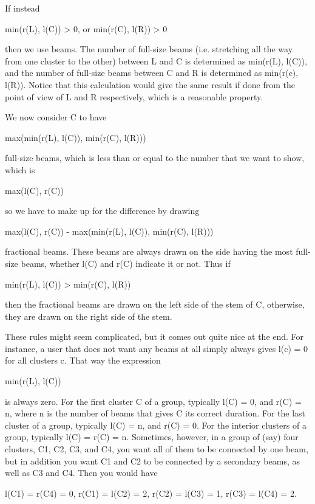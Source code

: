 If instead 

        min(r(L), l(C)) > 0, or
        min(r(C), l(R)) > 0

then we use beams.  The number of full-size beams (i.e. stretching all
the way from one cluster to the other) between L and C is determined as
min(r(L), l(C)), and the number of full-size beams between C and R is
determined as min(r(c), l(R)).  Notice that this calculation would give
the same result if done from the point of view of L and R respectively,
which is a reasonable property. 

We now consider C to have 

        max(min(r(L), l(C)), min(r(C), l(R)))

full-size beams, which is less than or equal to the number that we
want to show, which is

        max(l(C), r(C))

so we have to make up for the difference by drawing 

        max(l(C), r(C)) - max(min(r(L), l(C)), min(r(C), l(R)))

fractional beams.  These beams are always drawn on the side having the
most full-size beams, whether l(C) and r(C) indicate it or not.  Thus if

        min(r(L), l(C)) >  min(r(C), l(R))

then the fractional beams are drawn on the left side of the stem of C,
otherwise, they are drawn on the right side of the stem. 

These rules might seem complicated, but it comes out quite nice at the
end.  For instance, a user that does not want any beams at all simply
always gives l(c) = 0 for all clusters c. That way the expression 

        min(r(L), l(C))

is always zero.  For the first cluster C of a group, typically l(C) = 0,
and r(C) = n, where n is the number of beams that gives C its correct
duration.  For the last cluster of a group, typically l(C) = n,  and r(C)
= 0.  For the interior clusters of a group, typically l(C) = r(C) = n.
Sometimes, however, in a group of (say) four clusters, C1, C2, C3, and C4,
you want all of them to be connected by one beam, but in addition you
want C1 and C2 to be connected by a secondary beams, as well as C3 and
C4. Then you would have 

                l(C1) = r(C4) = 0, 
                r(C1) = l(C2) = 2,
                r(C2) = l(C3) = 1,
                r(C3) = l(C4) = 2.


